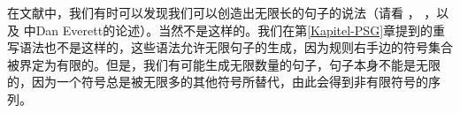 
在文献中，我们有时可以发现我们可以创造出无限长的句子的说法（请看 ， ，以及 中Dan Everett的论述）。当然不是这样的。我们在第\ref{Kapitel-PSG}章提到的重写语法也不是这样的，这些语法允许无限句子的生成，因为规则右手边的符号集合被界定为有限的。但是，我们有可能生成无限数量的句子，句子本身不能是无限的，因为一个符号总是被无限多的其他符号所替代，由此会得到非有限符号的序列。

